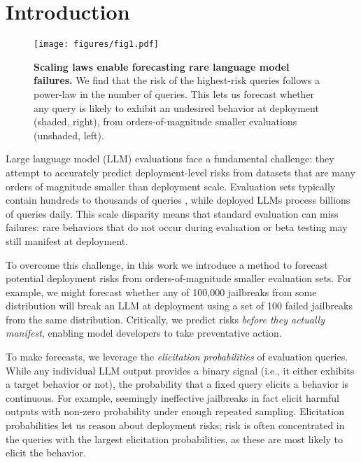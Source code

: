 \section{Introduction}
\label{sec:introduction}

\begin{figure}[t]
    \centering
    \texttt{[image: figures/fig1.pdf]}
    \caption{\textbf{Scaling laws enable forecasting rare language model failures.} We find that the risk of the highest-risk queries follows a power-law in the number of queries. This lets us forecast whether any query is likely to exhibit an undesired behavior at deployment (shaded, right), from orders-of-magnitude smaller evaluations (unshaded, left).}
    \vspace{-2mm}
    \label{fig:fig1}
\end{figure}

Large language model (LLM) evaluations face a fundamental challenge: they attempt to accurately predict deployment-level risks from datasets that are many orders of magnitude smaller than 
deployment scale. 
Evaluation sets typically contain hundreds to thousands of queries \citep[e.g.,][]{souly2024strongreject}, while deployed LLMs process billions of queries daily.
 This scale disparity means that standard evaluation can miss failures: rare behaviors that do not occur during evaluation or beta testing may still manifest at deployment.

To overcome this challenge, in this work we introduce a method to forecast potential deployment risks from orders-of-magnitude smaller evaluation sets. 
For example, we might forecast whether any of 100,000 jailbreaks from some distribution will break an LLM at deployment using a set of 100 failed jailbreaks from the same distribution. 
Critically, we predict risks \textit{before they actually manifest}, enabling model developers to take preventative action.

To make forecasts, we leverage the \emph{elicitation probabilities} of evaluation queries. While any individual LLM output provides a binary signal (i.e., it either exhibits a target behavior or not), the probability that a fixed query elicits a behavior is continuous. For example, seemingly ineffective jailbreaks in fact elicit harmful outputs with non-zero probability under enough repeated sampling. Elicitation probabilities let us reason about deployment risks; risk is often concentrated in the queries with the largest elicitation probabilities, as these are most likely to elicit the behavior.

